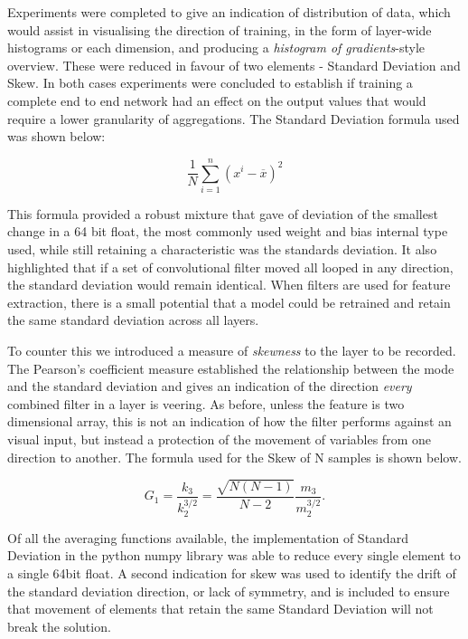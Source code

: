 Experiments were completed to give an indication of distribution of data, which would assist in visualising the direction of training, in the form of layer-wide histograms or each dimension, and producing a \textit{histogram of gradients}-style overview. These were reduced in favour of two elements - Standard Deviation and Skew. In both cases experiments were concluded to establish if training a complete end to end network had an effect on the output values that would require a lower granularity of aggregations. The Standard Deviation formula used was shown below:

\begin{equation}
    \label{eqn:stdev}
    \frac1N\sum_{i=1}^n\left(x^i-\overline x\right)^2
\end{equation}

This formula provided a robust mixture that gave of deviation of the smallest change in a 64 bit float, the most commonly used weight and bias internal type used, while still retaining a characteristic was the standards deviation. It also highlighted that if a set of convolutional filter moved all looped in any direction, the standard deviation would remain identical. When filters are used for feature extraction, there is a small potential that a model could be retrained and retain the same standard deviation across all layers.

To counter this we introduced a measure of \textit{skewness} to the layer to be recorded. The Pearson's coefficient measure established the relationship between the mode and the standard deviation and gives an indication of the direction \textit{every} combined filter in a layer is veering. As before, unless the feature is two dimensional array, this is not an indication of how the filter performs against an visual input, but instead a protection of the movement of variables from one direction to another. The formula used for the Skew of N samples is shown below. 

\begin{equation}
    \label{eqn:skew}
    G_1=\frac{k_3}{k_2^{3/2}}=\frac{\sqrt{N(N-1)}}{N-2}\frac{m_3}{m_2^{3/2}}.
\end{equation}


Of all the averaging functions available, the implementation of Standard Deviation in the python numpy library was able to reduce every single element to a single 64bit float. A second indication for skew was used to identify the drift of the standard deviation direction, or lack of symmetry,  and is included to ensure that movement of elements that retain the same Standard Deviation will not break the solution.

